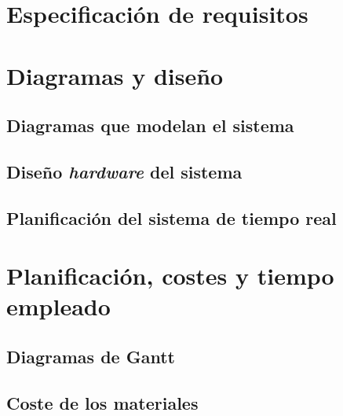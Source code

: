 \chapter{Especificación de requisitos}\label{chap:requirements}


\chapter{Diagramas y diseño}\label{chap:design}

\section{Diagramas que modelan el sistema}\label{sec:sys-diagrams}

\section{Diseño \textit{hardware} del sistema}\label{sec:hardware-design}

\section{Planificación del sistema de tiempo real}\label{sec:rt-design}


\chapter{Planificación, costes y tiempo empleado}\label{chap:planification}
\section{Diagramas de Gantt}

\section{Coste de los materiales}\label{sec:material-prize}

